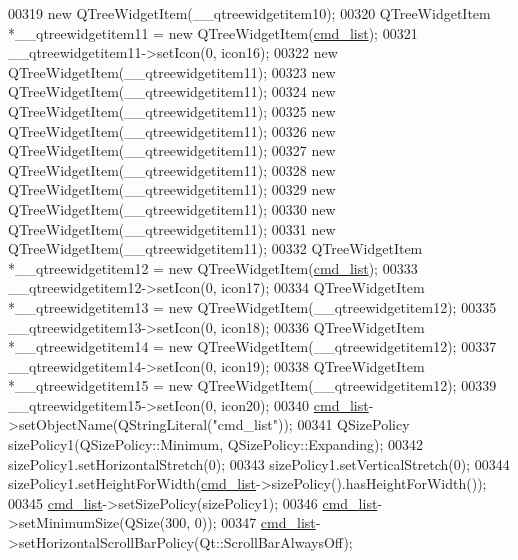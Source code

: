 \begin{DoxyCode}
00319         \textcolor{keyword}{new} QTreeWidgetItem(\_\_qtreewidgetitem10);
00320         QTreeWidgetItem *\_\_qtreewidgetitem11 = \textcolor{keyword}{new} QTreeWidgetItem(\hyperlink{a00080_aa66ece71395b435e915d384fb63bac1d}{cmd\_list});
00321         \_\_qtreewidgetitem11->setIcon(0, icon16);
00322         \textcolor{keyword}{new} QTreeWidgetItem(\_\_qtreewidgetitem11);
00323         \textcolor{keyword}{new} QTreeWidgetItem(\_\_qtreewidgetitem11);
00324         \textcolor{keyword}{new} QTreeWidgetItem(\_\_qtreewidgetitem11);
00325         \textcolor{keyword}{new} QTreeWidgetItem(\_\_qtreewidgetitem11);
00326         \textcolor{keyword}{new} QTreeWidgetItem(\_\_qtreewidgetitem11);
00327         \textcolor{keyword}{new} QTreeWidgetItem(\_\_qtreewidgetitem11);
00328         \textcolor{keyword}{new} QTreeWidgetItem(\_\_qtreewidgetitem11);
00329         \textcolor{keyword}{new} QTreeWidgetItem(\_\_qtreewidgetitem11);
00330         \textcolor{keyword}{new} QTreeWidgetItem(\_\_qtreewidgetitem11);
00331         \textcolor{keyword}{new} QTreeWidgetItem(\_\_qtreewidgetitem11);
00332         QTreeWidgetItem *\_\_qtreewidgetitem12 = \textcolor{keyword}{new} QTreeWidgetItem(\hyperlink{a00080_aa66ece71395b435e915d384fb63bac1d}{cmd\_list});
00333         \_\_qtreewidgetitem12->setIcon(0, icon17);
00334         QTreeWidgetItem *\_\_qtreewidgetitem13 = \textcolor{keyword}{new} QTreeWidgetItem(\_\_qtreewidgetitem12);
00335         \_\_qtreewidgetitem13->setIcon(0, icon18);
00336         QTreeWidgetItem *\_\_qtreewidgetitem14 = \textcolor{keyword}{new} QTreeWidgetItem(\_\_qtreewidgetitem12);
00337         \_\_qtreewidgetitem14->setIcon(0, icon19);
00338         QTreeWidgetItem *\_\_qtreewidgetitem15 = \textcolor{keyword}{new} QTreeWidgetItem(\_\_qtreewidgetitem12);
00339         \_\_qtreewidgetitem15->setIcon(0, icon20);
00340         \hyperlink{a00080_aa66ece71395b435e915d384fb63bac1d}{cmd\_list}->setObjectName(QStringLiteral(\textcolor{stringliteral}{"cmd\_list"}));
00341         QSizePolicy sizePolicy1(QSizePolicy::Minimum, QSizePolicy::Expanding);
00342         sizePolicy1.setHorizontalStretch(0);
00343         sizePolicy1.setVerticalStretch(0);
00344         sizePolicy1.setHeightForWidth(\hyperlink{a00080_aa66ece71395b435e915d384fb63bac1d}{cmd\_list}->sizePolicy().hasHeightForWidth());
00345         \hyperlink{a00080_aa66ece71395b435e915d384fb63bac1d}{cmd\_list}->setSizePolicy(sizePolicy1);
00346         \hyperlink{a00080_aa66ece71395b435e915d384fb63bac1d}{cmd\_list}->setMinimumSize(QSize(300, 0));
00347         \hyperlink{a00080_aa66ece71395b435e915d384fb63bac1d}{cmd\_list}->setHorizontalScrollBarPolicy(Qt::ScrollBarAlwaysOff);

\end{DoxyCode}
